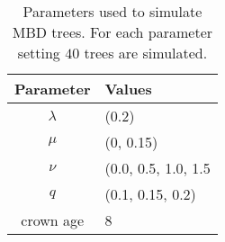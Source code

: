 \begin{table}[ht]
  \centering
  \begin{tabular}{ | c | l | }
    \hline
    \textbf{Parameter} &
    \textbf{Values} \\ 
    \hline
    $\lambda$ & (0.2) \\
    $\mu$ & (0, 0.15) \\
    $\nu$ & (0.0, 0.5, 1.0, 1.5 \\
    $q$ & (0.1, 0.15, 0.2) \\
    crown age & 8 \\
    \hline
  \end{tabular}
  \caption{
    Parameters used to simulate MBD trees. 
    For each parameter setting $40$ trees are simulated.
  }
  \label{tab:simulation_parameters}
\end{table}
